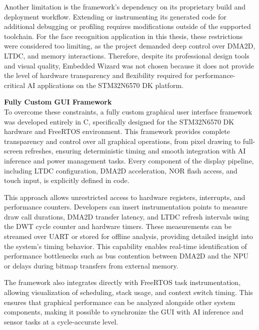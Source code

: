 \vspace{1em}
Another limitation is the framework’s dependency on its proprietary build and deployment workflow. Extending or instrumenting its generated code for additional debugging or profiling requires modifications outside of the supported toolchain. For the face recognition application in this thesis, these restrictions were considered too limiting, as the project demanded deep control over DMA2D, LTDC, and memory interactions. Therefore, despite its professional design tools and visual quality, Embedded Wizard was not chosen because it does not provide the level of hardware transparency and flexibility required for performance-critical AI applications on the STM32N6570 DK platform.

\vspace{0.8em}
\textbf{Fully Custom GUI Framework}\\
To overcome these constraints, a fully custom graphical user interface framework was developed entirely in C, specifically designed for the STM32N6570 DK hardware and FreeRTOS environment. This framework provides complete transparency and control over all graphical operations, from pixel drawing to full-screen refreshes, ensuring deterministic timing and smooth integration with AI inference and power management tasks. Every component of the display pipeline, including LTDC configuration, DMA2D acceleration, NOR flash access, and touch input, is explicitly defined in code.

\vspace{1em}
This approach allows unrestricted access to hardware registers, interrupts, and performance counters. Developers can insert instrumentation points to measure draw call durations, DMA2D transfer latency, and LTDC refresh intervals using the DWT cycle counter and hardware timers. These measurements can be streamed over UART or stored for offline analysis, providing detailed insight into the system’s timing behavior. This capability enables real-time identification of performance bottlenecks such as bus contention between DMA2D and the NPU or delays during bitmap transfers from external memory.

\vspace{1em}
The framework also integrates directly with FreeRTOS task instrumentation, allowing visualization of scheduling, stack usage, and context switch timing. This ensures that graphical performance can be analyzed alongside other system components, making it possible to synchronize the GUI with AI inference and sensor tasks at a cycle-accurate level.

